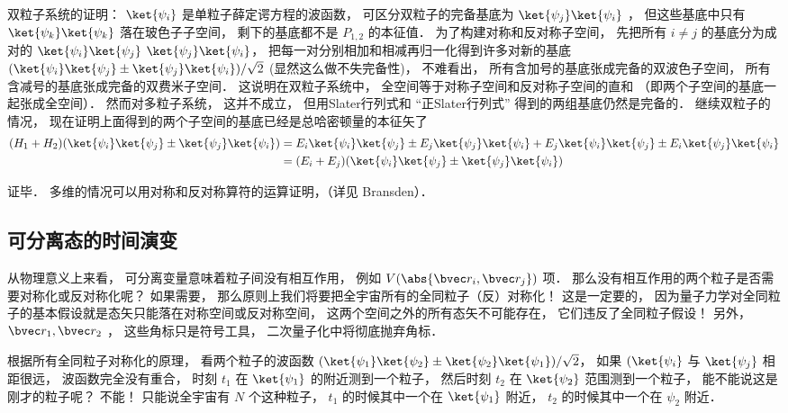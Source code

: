 双粒子系统的证明： $\ket{\psi_i}$ 是单粒子薛定谔方程的波函数， 可区分双粒子的完备基底为 $\ket{\psi_j}\ket{\psi_i}$ ， 但这些基底中只有 $\ket{\psi_k}\ket{\psi_k}$ 落在玻色子子空间， 剩下的基底都不是 $P_{1,2}$ 的本征值． 为了构建对称和反对称子空间， 先把所有 $i \ne j$ 的基底分为成对的 $\ket{\psi_i}\ket{\psi_j}$ $\ket{\psi_j}\ket{\psi_i}$， 把每一对分别相加和相减再归一化得到许多对新的基底 $(\ket{\psi_i}\ket{\psi_j} \pm \ket{\psi_j}\ket{\psi_i})/\sqrt{2}$ (显然这么做不失完备性)， 不难看出， 所有含加号的基底张成完备的双波色子空间， 所有含减号的基底张成完备的双费米子空间． 这说明在双粒子系统中， 全空间等于对称子空间和反对称子空间的直和 （即两个子空间的基底一起张成全空间）． 然而对多粒子系统， 这并不成立， 但用Slater行列式和 “正Slater行列式” 得到的两组基底仍然是完备的． 继续双粒子的情况， 现在证明上面得到的两个子空间的基底已经是总哈密顿量的本征矢了
\begin{equation}
\begin{aligned}
(H_1 + H_2) (\ket{\psi_i}\ket{\psi_j} \pm \ket{\psi_j}\ket{\psi_i}) &= E_i \ket{\psi_i}\ket{\psi_j} \pm E_j \ket{\psi_j}\ket{\psi_i} + E_j \ket{\psi_i}\ket{\psi_j} \pm E_i \ket{\psi_j}\ket{\psi_i}\\
&= (E_i + E_j) (\ket{\psi_i}\ket{\psi_j} \pm \ket{\psi_j}\ket{\psi_i})
\end{aligned}
\end{equation}

证毕．
多维的情况可以用对称和反对称算符的运算证明，（详见 Bransden）．

\subsection{可分离态的时间演变}
从物理意义上来看， 可分离变量意味着粒子间没有相互作用， 例如 $V(\abs{\bvec r_i, \bvec r_j})$ 项． 那么没有相互作用的两个粒子是否需要对称化或反对称化呢？ 如果需要， 那么原则上我们将要把全宇宙所有的全同粒子（反）对称化！ 这是一定要的， 因为量子力学对全同粒子的基本假设就是态矢只能落在对称空间或反对称空间， 这两个空间之外的所有态矢不可能存在， 它们违反了全同粒子假设！ 另外， $\bvec r_1, \bvec r_2$ ， 这些角标只是符号工具， 二次量子化中将彻底抛弃角标．

根据所有全同粒子对称化的原理， 看两个粒子的波函数 $(\ket{\psi_1}\ket{\psi_2} \pm \ket{\psi_2}\ket{\psi_1})/\sqrt{2}$， 如果 $(\ket{\psi_i}$ 与 $\ket{\psi_j}$ 相距很远， 波函数完全没有重合， 时刻 $t_1$ 在 $\ket{\psi_1}$ 的附近测到一个粒子， 然后时刻 $t_2$ 在 $\ket{\psi_2}$ 范围测到一个粒子， 能不能说这是刚才的粒子呢？ 不能！ 只能说全宇宙有 $N$ 个这种粒子， $t_1$ 的时候其中一个在 $\ket{\psi_1}$ 附近， $t_2$ 的时候其中一个在 $\psi_2$ 附近．
